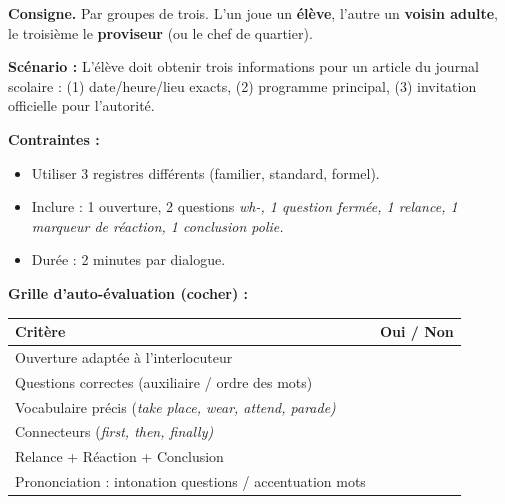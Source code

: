 \documentclass[11pt]{article}
\newcommand{\eng}[1]{\ifmmode\text{\textit{#1}}\else\begingroup\selectlanguage{english}\itshape #1\endgroup\fi}
\begin{document}
\begin{experience}
\textbf{Consigne.} Par groupes de trois. L'un joue un \textbf{élève}, l'autre un \textbf{voisin adulte}, le troisième le \textbf{proviseur} (ou le chef de quartier).\par
\textbf{Scénario :} L'élève doit obtenir trois informations pour un article du journal scolaire : (1) date/heure/lieu exacts, (2) programme principal, (3) invitation officielle pour l'autorité.\par
\textbf{Contraintes :}
\begin{itemize}
\item Utiliser 3 registres différents (familier, standard, formel).
\item Inclure : 1 ouverture, 2 questions \eng{wh-}, 1 question fermée, 1 relance, 1 marqueur de réaction, 1 conclusion polie.
\item Durée : 2 minutes par dialogue.
\end{itemize}
\textbf{Grille d'auto-évaluation (cocher) :}
\begin{tabular}{|l|c|}\hline
\rowcolor{popblueL} Critère & Oui / Non \\ \hline
Ouverture adaptée à l'interlocuteur & \\ \hline
Questions correctes (auxiliaire / ordre des mots) & \\ \hline
Vocabulaire précis (\eng{take place, wear, attend, parade}) & \\ \hline
Connecteurs (\eng{first, then, finally}) & \\ \hline
Relance + Réaction + Conclusion & \\ \hline
Prononciation : intonation questions / accentuation mots & \\ \hline
\end{tabular}
\end{experience}
\end{document}

